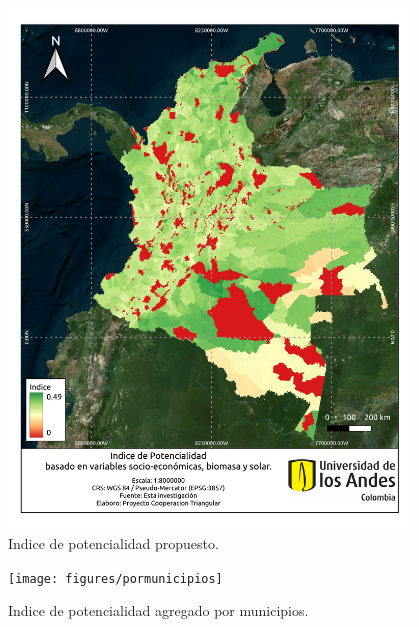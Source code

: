 \begin{figure}
    \centering
    \includegraphics[width=0.95\textwidth]{figures/indice}
    \caption{Indice de potencialidad propuesto.}
    \label{fig:indice}
\end{figure}

\begin{figure}
    \centering
    \texttt{[image: figures/pormunicipios]}
    \caption{Indice de potencialidad agregado por municipios.}
    \label{fig:pormunicipios}
\end{figure}

